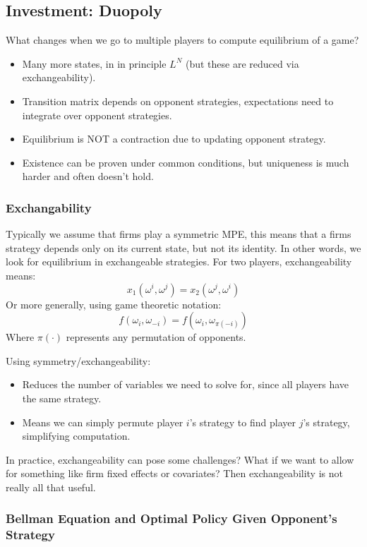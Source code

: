 \documentclass[twoside]{article}
\begin{document}
\subsection{Investment: Duopoly}

What changes when we go to multiple players to compute equilibrium of a game? 
\begin{itemize}
\item Many more states, in in principle $L^N$ (but these are reduced via exchangeability). 
\item Transition matrix depends on opponent strategies, expectations need to integrate over opponent strategies. 
\item Equilibrium is NOT a contraction due to updating opponent strategy. 
\item Existence can be proven under common conditions, but uniqueness is much harder and often doesn't hold. 
\end{itemize}

\subsubsection{Exchangability}

Typically we assume that firms play a symmetric MPE, this means that a firms strategy depends only on its current state, but not its identity. 
In other words, we look for equilibrium in exchangeable strategies. For two players, exchangeability means: 
$$ x_1(\omega^i, \omega^j) = x_2(\omega^j, \omega^i)$$
Or more generally, using game theoretic notation: 
$$ f(\omega_i, \omega_{-i}) = f(\omega_i, \omega_{\pi(-i)})$$
Where $\pi(\cdot)$ represents any permutation of opponents. 

Using symmetry/exchangeability: 
\begin{itemize}
\item Reduces the number of variables we need to solve for, since all players have the same strategy. 
\item Means we can simply permute player $i$'s strategy to find player $j$'s strategy, simplifying computation. 
\end{itemize}

In practice, exchangeability can pose some challenges? What if we want to allow for something like firm fixed effects or covariates? Then exchangeability is not really all that useful. 

\subsubsection{Bellman Equation and Optimal Policy Given Opponent's Strategy}
\end{document}
